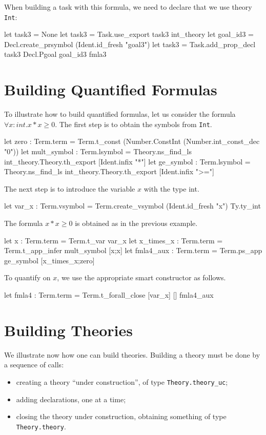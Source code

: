 When building a task with this formula, we need to declare that we use
theory \texttt{Int}:
\begin{ocamlcode}
let task3 = None
let task3 = Task.use_export task3 int_theory
let goal_id3 = Decl.create_prsymbol (Ident.id_fresh "goal3")
let task3 = Task.add_prop_decl task3 Decl.Pgoal goal_id3 fmla3
\end{ocamlcode}

\section{Building Quantified Formulas}

To illustrate how to build quantified formulas, let us consider
the formula $\forall x:int. x*x \geq 0$. The first step is to
obtain the symbols from \texttt{Int}.
\begin{ocamlcode}
let zero : Term.term =
  Term.t_const (Number.ConstInt (Number.int_const_dec "0"))
let mult_symbol : Term.lsymbol =
  Theory.ns_find_ls int_theory.Theory.th_export [Ident.infix "*"]
let ge_symbol : Term.lsymbol =
  Theory.ns_find_ls int_theory.Theory.th_export [Ident.infix ">="]
\end{ocamlcode}
The next step is to introduce the variable $x$ with the type int.
\begin{ocamlcode}
let var_x : Term.vsymbol =
  Term.create_vsymbol (Ident.id_fresh "x") Ty.ty_int
\end{ocamlcode}
The formula $x*x \geq 0$ is obtained as in the previous example.
\begin{ocamlcode}
let x : Term.term = Term.t_var var_x
let x_times_x : Term.term = Term.t_app_infer mult_symbol [x;x]
let fmla4_aux : Term.term = Term.ps_app ge_symbol [x_times_x;zero]
\end{ocamlcode}
To quantify on $x$, we use the appropriate smart constructor as follows.
\begin{ocamlcode}
let fmla4 : Term.term = Term.t_forall_close [var_x] [] fmla4_aux
\end{ocamlcode}

\section{Building Theories}

We illustrate now how one can build theories. Building a theory must
be done by a sequence of calls:
\begin{itemize}
\item creating a theory ``under construction'', of type \verb|Theory.theory_uc|;
\item adding declarations, one at a time;
\item closing the theory under construction, obtaining something of type \verb|Theory.theory|.
\end{itemize}

